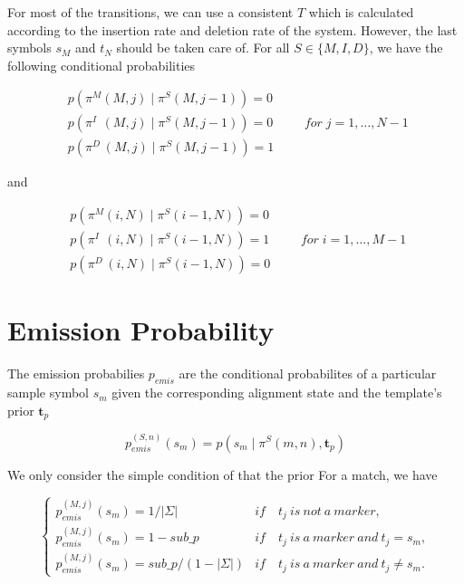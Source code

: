 \documentclass[10pt]{article}
\begin{document}
  For most of the transitions, we can use a consistent $T$ which is calculated according to the insertion rate and deletion rate of the system. However, the last symbols $s_M$ and $t_N$ should be taken care of. For all $S \in \{M, I, D\}$, we have the following conditional probabilities
  
  \begin{equation} \label{eq002}
    \begin{aligned}
      p\left(\pi^{M}(M, j) \;|\; \pi^{S}(M, j-1)\right) = 0 \\
      p\left(\pi^{I\;\;}(M, j) \;|\; \pi^{S}(M, j-1)\right) = 0 \\
      p\left(\pi^{D\;}(M, j) \;|\; \pi^{S}(M, j-1)\right) = 1
    \end{aligned} \qquad for\; j=1,\dots,N-1
  \end{equation}

  and

  \begin{equation} \label{eq003}
    \begin{aligned}
      p\left(\pi^{M}(i, N) \;|\; \pi^{S}(i-1, N)\right) = 0 \\
      p\left(\pi^{I\;\;}(i, N) \;|\; \pi^{S}(i-1,N)\right) = 1\\
      p\left(\pi^{D\;}(i, N) \;|\; \pi^{S}(i-1, N)\right) = 0
    \end{aligned} \qquad for\; i=1,\dots,M-1
  \end{equation}

\section{Emission Probability}

  The emission probabilies $p_{emis}$ are the conditional probabilites of a particular sample symbol $s_m$ given the corresponding alignment state and the template's prior $\mathbf{t}_p$

  \begin{equation}
    p_{emis}^{(S, n)}(s_m) = p\left(s_m \;|\; \pi^S(m, n), \mathbf{t}_p\right)
  \end{equation}

  We only consider the simple condition of  that the prior For a match, we have

  \begin{equation}
    \begin{cases}
      p_{emis}^{(M, j)}(s_m) = 1 / |\Sigma|        &if \quad t_j\ is\ not\ a\ marker, \\
      p_{emis}^{(M, j)}(s_m) = 1 - sub\_p          &if \quad t_j\ is\ a\ marker\ and\ t_j = s_m, \\
      p_{emis}^{(M, j)}(s_m) = sub\_p/(1-|\Sigma|) &if \quad t_j\ is\ a\ marker\ and\ t_j \neq s_m.
      
    \end{cases}
  \end{equation}
\end{document}

